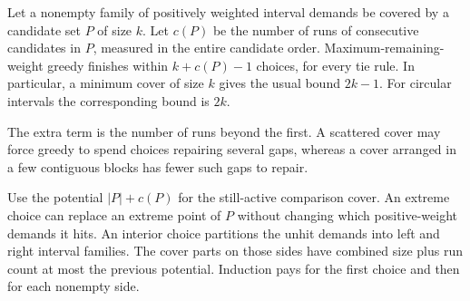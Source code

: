 \begin{lemma}
\label{lem:greedy-cover-length}
Let a nonempty family of positively weighted interval demands
be covered by a candidate set $P$ of size $k$. Let $c(P)$ be the
number of runs of consecutive candidates in $P$, measured in the
entire candidate order. Maximum-remaining-weight greedy finishes
within $k+c(P)-1$ choices, for every tie rule.
In particular, a minimum cover of size $k$ gives the usual bound
$2k-1$. For circular intervals the corresponding bound is $2k$.
\end{lemma}
\noindent
The extra term is the number of runs beyond the first. A scattered
cover may force greedy to spend choices repairing several gaps,
whereas a cover arranged in a few contiguous blocks has fewer such
gaps to repair.
\begin{proofstrategy}
Use the potential $|P|+c(P)$ for the still-active comparison cover.
An extreme choice can replace an extreme point of $P$ without changing
which positive-weight demands it hits. An interior choice partitions
the unhit demands into left and right interval families. The cover
parts on those sides have combined size plus run count at most the
previous potential. Induction pays for the first choice and then for
each nonempty side.
\end{proofstrategy}
